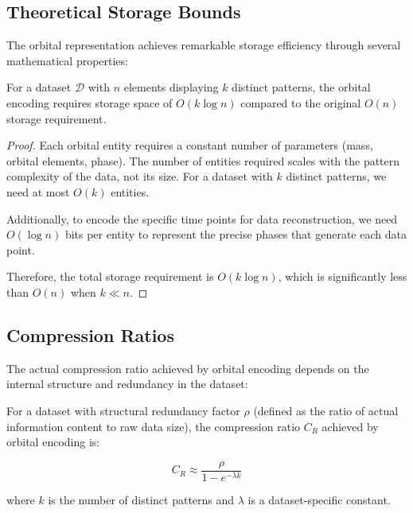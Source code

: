 \subsection{Theoretical Storage Bounds}

The orbital representation achieves remarkable storage efficiency through several mathematical properties:

\begin{theorem}
For a dataset $\mathcal{D}$ with $n$ elements displaying $k$ distinct patterns, the orbital encoding requires storage space of $O(k \log n)$ compared to the original $O(n)$ storage requirement.
\end{theorem}

\begin{proof}
Each orbital entity requires a constant number of parameters (mass, orbital elements, phase). The number of entities required scales with the pattern complexity of the data, not its size. For a dataset with $k$ distinct patterns, we need at most $O(k)$ entities.

Additionally, to encode the specific time points for data reconstruction, we need $O(\log n)$ bits per entity to represent the precise phases that generate each data point.

Therefore, the total storage requirement is $O(k \log n)$, which is significantly less than $O(n)$ when $k \ll n$.
\end{proof}

\subsection{Compression Ratios}

The actual compression ratio achieved by orbital encoding depends on the internal structure and redundancy in the dataset:

\begin{proposition}
For a dataset with structural redundancy factor $\rho$ (defined as the ratio of actual information content to raw data size), the compression ratio $C_R$ achieved by orbital encoding is:

\begin{equation}
C_R \approx \frac{\rho}{1 - e^{-\lambda k}}
\end{equation}

where $k$ is the number of distinct patterns and $\lambda$ is a dataset-specific constant.
\end{proposition}

